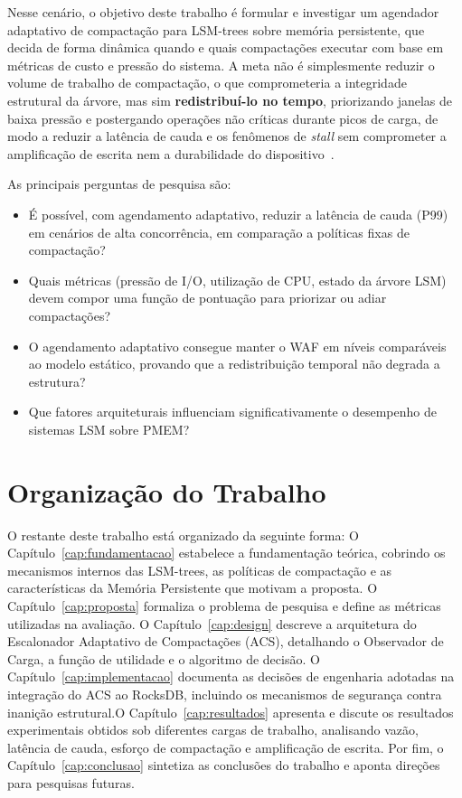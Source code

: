 Nesse cenário, o objetivo deste trabalho é formular e investigar um agendador
adaptativo de compactação para LSM-trees sobre memória persistente, que
decida de forma dinâmica quando e quais compactações executar com base em
métricas de custo e pressão do sistema. A meta não é simplesmente reduzir o volume
de trabalho de compactação, o que comprometeria a integridade estrutural da
árvore, mas sim \textbf{redistribuí-lo no tempo}, priorizando janelas de baixa
pressão e postergando operações não críticas durante picos de carga, de modo a
reduzir a latência de cauda e os fenômenos de \textit{stall} sem comprometer a
amplificação de escrita nem a durabilidade do dispositivo~\cite{dCompaction}.

As principais perguntas de pesquisa são:

\begin{itemize}
    \item É possível, com agendamento adaptativo, reduzir a latência de cauda
    (P99) em cenários de alta concorrência, em comparação a políticas fixas de
    compactação?
    \item Quais métricas (pressão de I/O, utilização de CPU, estado da árvore LSM)
    devem compor uma função de pontuação para priorizar ou adiar compactações?
    \item O agendamento adaptativo consegue manter o WAF em níveis comparáveis ao
    modelo estático, provando que a redistribuição temporal não degrada a estrutura?
    \item Que fatores arquiteturais influenciam
    significativamente o desempenho de sistemas LSM sobre PMEM?
\end{itemize}

\section{Organização do Trabalho}

O restante deste trabalho está organizado da seguinte forma: O Capítulo~\ref{cap:fundamentacao} estabelece a fundamentação teórica,
cobrindo os mecanismos internos das LSM-trees, as políticas de compactação e as características da Memória Persistente que motivam a proposta. O Capítulo~\ref{cap:proposta} formaliza o problema de pesquisa e define as métricas utilizadas na avaliação. O Capítulo~\ref{cap:design} descreve a arquitetura do Escalonador Adaptativo de Compactações (ACS), detalhando o Observador de Carga, a função de utilidade
e o algoritmo de decisão. O Capítulo~\ref{cap:implementacao} documenta as decisões de engenharia adotadas na integração do ACS ao RocksDB, incluindo os mecanismos de segurança contra inanição estrutural.O Capítulo~\ref{cap:resultados} apresenta e discute os resultados experimentais obtidos sob diferentes cargas de trabalho, analisando vazão, latência de cauda, esforço de compactação e amplificação de escrita. Por fim, o Capítulo~\ref{cap:conclusao} sintetiza as conclusões do trabalho e aponta direções para pesquisas futuras.

